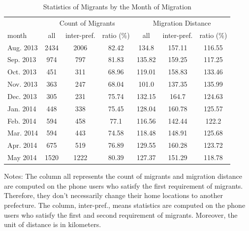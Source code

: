 \clearpage\newpage
\begin{table}[htbp]
\renewcommand{\arraystretch}{1.5}
\setlength{\tabcolsep}{4mm}{}
\centering
\small
\caption{Statistics of Migrants by the Month of Migration}
\begin{tabular}{lcccccc} \hline
& \multicolumn{3}{c}{Count of Migrants} & \multicolumn{3}{c}{Migration Distance} \\
\cline{2-4} \cline{5-7}
month & all & inter-pref. & ratio (\%) & all & inter-pref. & ratio (\%) \\ \hline
Aug. 2013 & 2434 & 2006 & 82.42 & 134.8 & 157.11 & 116.55 \\
Sep. 2013 & 974 & 797 & 81.83 & 135.82 & 159.25 & 117.25 \\
Oct. 2013 & 451 & 311 & 68.96 & 119.01 & 158.83 & 133.46 \\
Nov. 2013 & 363 & 247 & 68.04 & 101.0 & 137.35 & 135.99 \\
Dec. 2013 & 305 & 231 & 75.74 & 132.15 & 164.7 & 124.63 \\
Jan. 2014 & 448 & 338 & 75.45 & 128.04 & 160.78 & 125.57 \\
Feb. 2014 & 594 & 458 & 77.1 & 116.56 & 142.44 & 122.2 \\
Mar. 2014 & 594 & 443 & 74.58 & 118.48 & 148.91 & 125.68 \\
Apr. 2014 & 675 & 519 & 76.89 & 129.55 & 160.28 & 123.72 \\
May 2014 & 1520 & 1222 & 80.39 & 127.37 & 151.29 & 118.78 \\
\hline

\end{tabular}
\label{tab:migration_sample}%

\end{table}%

\vspace{-3em}
\begin{singlespace}
\begin{footnotesize}
\noindent Notes: The column all represents the count of migrants and migration distance are computed on the phone users who satisfy the first requirement of migrants. Therefore, they don't necessarily change their home locations to another prefecture. The column, inter-pref., means statistics are computed on the phone users who satisfy the first and second requirement of migrants. Moreover, the unit of distance is in kilometers.
\end{footnotesize}
\end{singlespace}

